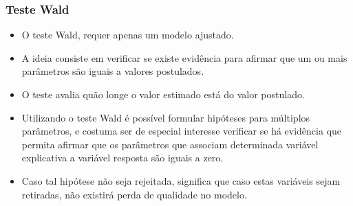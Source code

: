 \documentclass[10pt,
  aspectratio=169,
  serif,
  mathserif,
  professionalfont,
  compress,
  handout,
  ]{beamer}\usepackage[]{graphicx}\usepackage[]{color}
\begin{document}

\begin{frame}
  \frametitle{Teste Wald}

  \begin{itemize}
    \itemsep 2ex

  \item O teste Wald, requer apenas um modelo ajustado. 
  
  \item A ideia consiste em verificar se existe evidência para afirmar que um ou mais parâmetros são iguais a valores postulados. 

  \item O teste avalia quão longe o valor estimado está do valor postulado. 

  \item Utilizando o teste Wald é possível formular hipóteses para múltiplos parâmetros, e costuma ser de especial interesse verificar se há evidência que permita afirmar que os parâmetros que associam determinada variável explicativa a variável resposta são iguais a zero. 

  \item Caso tal hipótese não seja rejeitada, significa que caso estas variáveis sejam retiradas, não existirá perda de qualidade no modelo.

  \end{itemize}

\end{frame}

\end{document}
